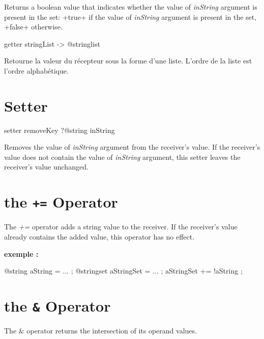 Returns a boolean value that indicates whether the value of \emph{inString} argument is present in the set: \ggs+true+ if the value of \emph{inString} argument is present in the set, \ggs+false+ otherwise.





\begin{galgas}
getter stringList -> @stringlist
\end{galgas}

Retourne la valeur du récepteur sous la forme d'une liste. L'ordre de la liste est l'ordre alphabétique.



\section{Setter}


\begin{galgas}
setter removeKey ?@string inString
\end{galgas}


Removes the value of \emph{inString} argument from the receiver's value. If the receiver's value does not contain the value of \emph{inString} argument, this setter leaves the receiver's value unchanged.






\section{the \texttt{+=} Operator}

The \emph{+=} operator adds a string value to the receiver. If the receiver's value already contains the added value, this operator has no effect.

\textbf{exemple :}
\begin{galgas}
@string aString = ... ;
@stringset aStringSet = ... ;
aStringSet += !aString ;
\end{galgas}




\section{the \texttt{\&} Operator}

The \emph{$\&$} operator returns the intersection of its operand values.


